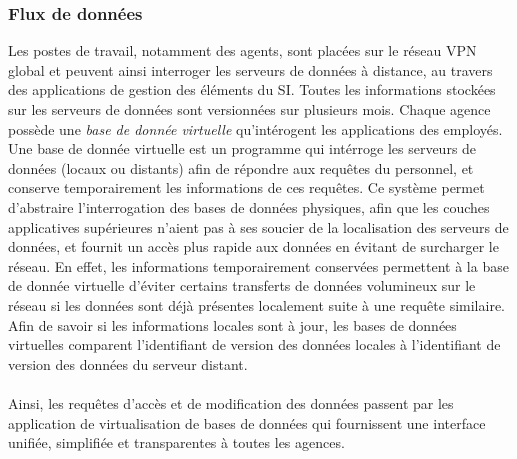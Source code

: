 \subsubsection{ Flux de données }

Les postes de travail, notamment des agents, sont placées sur le réseau VPN global et peuvent ainsi interroger les serveurs de données à distance, au travers des applications de gestion des éléments du SI. Toutes les informations stockées sur les serveurs de données sont versionnées sur plusieurs mois. Chaque agence possède une \textit{base de donnée virtuelle} qu'intérogent les applications des employés.\\
Une base de donnée virtuelle est un programme qui intérroge les serveurs de données (locaux ou distants) afin de répondre aux requêtes du personnel, et conserve temporairement les informations de ces requêtes. Ce système permet d'abstraire l'interrogation des bases de données physiques, afin que les couches applicatives supérieures n'aient pas à ses soucier de la localisation des serveurs de données, et fournit un accès plus rapide aux données en évitant de surcharger le réseau. En effet, les informations temporairement conservées permettent à la base de donnée virtuelle d'éviter certains transferts de données volumineux sur le réseau si les données sont déjà présentes localement suite à une requête similaire. Afin de savoir si les informations locales sont à jour, les bases de données virtuelles comparent l'identifiant de version des données locales à l'identifiant de version des données du serveur distant.\\
~\\
Ainsi, les requêtes d'accès et de modification des données passent par les application de virtualisation de bases de données qui fournissent une interface unifiée, simplifiée et transparentes à toutes les agences.

